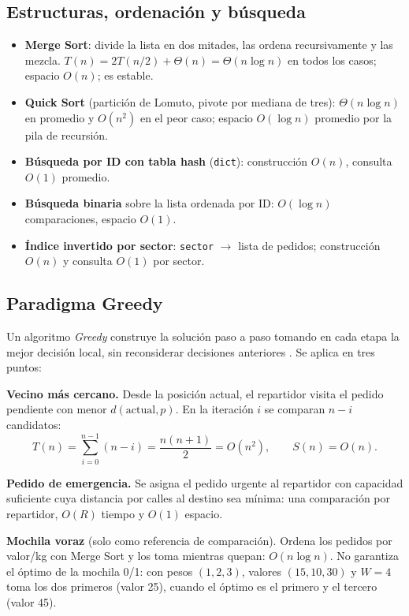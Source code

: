 \subsection{Estructuras, ordenación y búsqueda}

\begin{itemize}
    \item \textbf{Merge Sort}: divide la lista en dos mitades, las ordena recursivamente y las mezcla. $T(n)=2T(n/2)+\Theta(n)=\Theta(n\log n)$ en todos los casos; espacio $O(n)$; es estable.
    \item \textbf{Quick Sort} (partición de Lomuto, pivote por mediana de tres): $\Theta(n\log n)$ en promedio y $O(n^2)$ en el peor caso; espacio $O(\log n)$ promedio por la pila de recursión.
    \item \textbf{Búsqueda por ID con tabla hash} (\texttt{dict}): construcción $O(n)$, consulta $O(1)$ promedio.
    \item \textbf{Búsqueda binaria} sobre la lista ordenada por ID: $O(\log n)$ comparaciones, espacio $O(1)$.
    \item \textbf{Índice invertido por sector}: \texttt{sector} $\to$ lista de pedidos; construcción $O(n)$ y consulta $O(1)$ por sector.
\end{itemize}

\subsection{Paradigma Greedy}

Un algoritmo \textit{Greedy} construye la solución paso a paso tomando en cada etapa la mejor decisión local, sin reconsiderar decisiones anteriores \citep{cormen2022introduction}. Se aplica en tres puntos:

\textbf{Vecino más cercano.} Desde la posición actual, el repartidor visita el pedido pendiente con menor $d(\text{actual},p)$. En la iteración $i$ se comparan $n-i$ candidatos:
\begin{equation}
    T(n)=\sum_{i=0}^{n-1}(n-i)=\frac{n(n+1)}{2}=O(n^2), \qquad S(n)=O(n).
\end{equation}

\textbf{Pedido de emergencia.} Se asigna el pedido urgente al repartidor con capacidad suficiente cuya distancia por calles al destino sea mínima: una comparación por repartidor, $O(R)$ tiempo y $O(1)$ espacio.

\textbf{Mochila voraz} (solo como referencia de comparación). Ordena los pedidos por valor/kg con Merge Sort y los toma mientras quepan: $O(n\log n)$. No garantiza el óptimo de la mochila 0/1: con pesos $(1,2,3)$, valores $(15,10,30)$ y $W=4$ toma los dos primeros (valor 25), cuando el óptimo es el primero y el tercero (valor 45).


